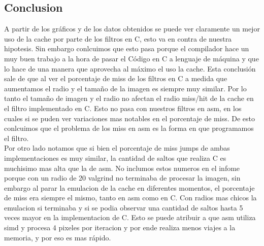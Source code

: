\subsection{Conclusion} 

A partir de los gráficos y de los datos obtenidos se puede ver claramente un mejor uso de la cache por parte de los filtros en C, esto va en contra de nuestra hipotesis. Sin embargo conlcuimos que esto pasa porque el compilador hace un muy buen trabajo a la hora de pasar el Código en C a lenguaje de máquina y que lo hace de una manera que aprovecha al máximo el uso la cache. Esta conclusión sale de que al ver el porcentaje de miss de los filtros en C a medida que aumentamos el radio y el tamaño de la imagen es siempre muy similar. Por lo tanto el tamaño de imagen y el radio no afectan el radio miss/hit de la cache en el filtro implementado en  C. Esto no pasa con nuestros filtros en asm, en los cuales si se puden ver variaciones mas notables en el porcentaje de miss. De esto conlcuimos que el problema de los miss en asm es la forma en que programamos el filtro. \\
Por otro lado notamos que si bien el porcentaje de miss jumps de ambas implementaciones es muy similar, la cantidad de saltos que realiza C es muchisimo mas alta que la de asm. No inclumos estos numeros en el infome porque con un radio de 20 valgrind no terminaba de procesar la imagen, sin embargo al parar la emulacion de la cache en diferentes momentos, el porcentaje de miss era siempre el mismo, tanto en asm como en C. Con radios mas chicos la emulacion si terminaba y si se podia observar una cantidad de saltos hasta 5 veces mayor en la implementacion de C. Esto se puede atribuir a que asm utiliza simd y procesa 4 pixeles por iteracion y por ende realiza menos viajes a la memoria, y por eso es mas rápido.
